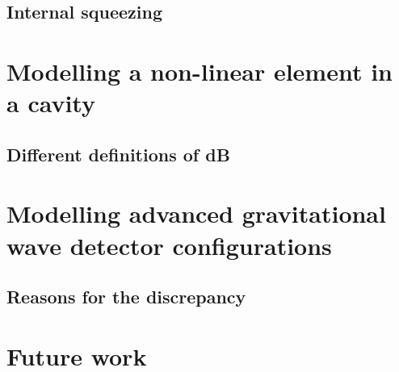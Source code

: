 \documentclass[aps,pra,superscriptaddress,reprint,nofootinbib]{revtex4-1}
\begin{document}
\subsection{Internal squeezing}



\section{Modelling a non-linear element in a cavity}



\subsection{Different definitions of dB}





\section{Modelling advanced gravitational wave detector configurations}


\subsection{Reasons for the discrepancy}





\section{Future work}
\label{sec:future_work}
\end{document}
